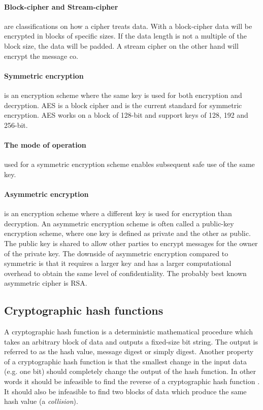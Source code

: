 \documentclass[english,12pt,a4paper]{book}
\begin{document}
\paragraph{Block-cipher and Stream-cipher} are classifications on how a cipher
treats data\cite[p. 32]{stallings}. With a block-cipher data will be encrypted
in blocks of specific sizes. If the data length is not a multiple of the block
size, the data will be padded. A stream cipher on the other hand will encrypt
the message co.

\paragraph{Symmetric encryption} is an encryption scheme where the same key is
used for both encryption and decryption\cite[p. 32]{stallings}. \ac{AES} is a
block cipher and is the current standard for symmetric encryption. \ac{AES}
works on a block of 128-bit and support keys of 128, 192 and 256-bit. 

\paragraph{The mode of operation} used for a symmetric encryption scheme
enables subsequent safe use of the same key.

\paragraph{Asymmetric encryption} is an encryption scheme where a different key
is used for encryption than decryption\cite[p. 259]{stallings}. An asymmetric
encryption scheme is often called a public-key encryption scheme, where one key
is defined as private and the other as public. The public key is shared to
allow other parties to encrypt messages for the owner of the private key. The
downside of asymmetric encryption compared to symmetric is that it requires a
larger key and has a larger computational overhead to obtain the same level of
confidentiality. The probably best known asymmetric cipher is \ac{RSA}.

\subsection{Cryptographic hash functions}
A cryptographic hash function is a deterministic mathematical procedure which
takes an arbitrary block of data and outputs a fixed-size bit string. The output
is referred to as the hash value, message digest or simply digest.
Another property of a cryptographic hash function is that the smallest change in
the input data (e.g. one bit) should completely change the output of the hash
function. In other words it should be infeasible to find the reverse of a
cryptographic hash function \cite[p. 335]{stallings}. It should also be infeasible to
find two blocks of data which produce the same hash value (a \emph{collision}).
\end{document}
